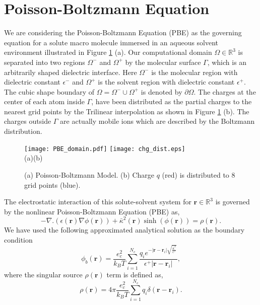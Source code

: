 \section{Poisson-Boltzmann Equation}
We are considering the Poisson-Boltzmann Equation (PBE) as the governing equation for a solute macro molecule immersed in an aqueous solvent environment illustrated in Figure \ref{fig_PBmodel} (a). Our computational domain $\Omega \in \mathbb{R}^3$ is separated into two regions $\Omega^-$ and $\Omega^+$ by the molecular surface $\Gamma$, which is an arbitrarily shaped dielectric interface. Here $\Omega^-$ is the molecular region with dielectric constant $\epsilon^-$ and $\Omega^+$ is the solvent region with dielectric constant $\epsilon^+$. The cubic shape boundary of $\Omega= \Omega^-\cup \Omega^+ $ is denoted by $\partial \Omega$. The charges at the center of each atom inside $\Gamma$, have been distributed as the partial charges to the nearest grid points by the Trilinear interpolation as shown in Figure \ref{fig_PBmodel} (b). The charges outside $\Gamma$ are actually mobile ions which are described by the Boltzmann distribution. 

\begin{figure}[!ht]
\centering
	\texttt{[image: PBE\_domain.pdf]}
	\hspace{8mm}
	\texttt{[image: chg\_dist.eps]}\\
	(a)\hspace{3.3in}(b)
	\caption{(a) Poisson-Boltzmann Model. (b) Charge $q$ (red) is distributed to 8 grid points (blue).}
	\label{fig_PBmodel}
\end{figure}

The electrostatic interaction of this solute-solvent system for $\textbf{r} \in \mathbb{R}^3$ is governed by the nonlinear Poisson-Boltzmann Equation (PBE) as, 
\begin{equation}
			-\nabla.(\epsilon(\textbf{r})\nabla \phi(\textbf{r}))+\bar\kappa^2(\textbf{r}) \sinh (\phi(\textbf{r}))=\rho(\textbf{r}).\label{pbe} %
\end{equation}
We have used the following approximated analytical solution \cite{Holst1995} as the boundary condition
\begin{equation}
	\phi_b (\textbf{r}) = \frac{e_c^2}{k_B T} \sum_{i=1}^{N_c} \frac{q_i e^{-|\textbf{r}-\textbf{r}_i | \sqrt{\frac{\bar\kappa^2}{\epsilon^+}} }}{\epsilon^{+}|\textbf{r}-\textbf{r}_i|}, \label{bd_cond}
\end{equation}
where the singular source $\rho(\textbf{r})$ term is defined as,
\begin{equation}
	\rho(\textbf{r})= 4\pi \frac{e_c^2}{k_B T}\sum_{i=1}^{N_c} q_i \delta(\textbf{r}-\textbf{r}_i). \label{rho}
\end{equation}

